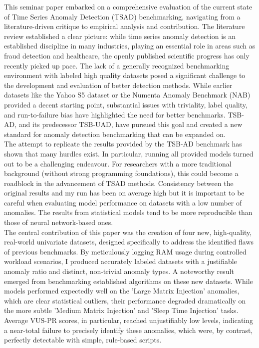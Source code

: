 \documentclass[12pt,oneside]{article}
\begin{document}
This seminar paper embarked on a comprehensive evaluation of the current state of Time Series Anomaly Detection (TSAD) benchmarking, navigating from a literature-driven critique to empirical analysis and contribution. The literature review established a clear picture: while time series anomaly detection is an established discipline in many industries, playing an essential role in areas such as fraud detection and healthcare, the openly published scientific progress has only recently picked up pace. The lack of a generally recognized benchmarking environment with labeled high quality datasets posed a significant challenge to the development and evaluation of better detection methods. While earlier datasets like the Yahoo S5 dataset or the Numenta Anomaly Benchmark (NAB) provided a decent starting point, substantial issues with triviality, label quality, and run-to-failure bias have highlighted the need for better benchmarks. TSB-AD, and its predecessor TSB-UAD, have pursued this goal and created a new standard for anomaly detection benchmarking that can be expanded on. \\
The attempt to replicate the results provided by the TSB-AD benchmark has shown that many hurdles exist. In particular, running all provided models turned out to be a challenging endeavour. For researchers with a more traditional background (without strong programming foundations), this could become a roadblock in the advancement of TSAD methods. Consistency between the original results and my run has been on average high but it is important to be careful when evaluating model performance on datasets with a low number of anomalies. The results from statistical models tend to be more reproducible than those of neural network-based ones. \\
The central contribution of this paper was the creation of four new, high-quality, real-world univariate datasets, designed specifically to address the identified flaws of previous benchmarks. By meticulously logging RAM usage during controlled workload scenarios, I produced accurately labeled datasets with a justifiable anomaly ratio and distinct, non-trivial anomaly types. A noteworthy result emerged from benchmarking established algorithms on these new datasets. While models performed expectedly well on the 'Large Matrix Injection' anomalies, which are clear statistical outliers, their performance degraded dramatically on the more subtle 'Medium Matrix Injection' and 'Sleep Time Injection' tasks. Average VUS-PR scores, in particular, reached unjustifiably low levels, indicating a near-total failure to precisely identify these anomalies, which were, by contrast, perfectly detectable with simple, rule-based scripts. \\
\end{document}
